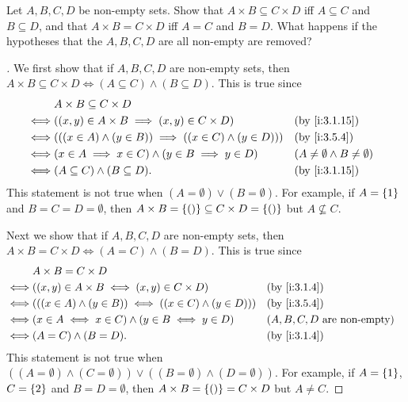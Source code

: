 \begin{ex}\label{i:ex:3.5.6}
  Let \(A, B, C, D\) be non-empty sets.
  Show that \(A \times B \subseteq C \times D\) iff \(A \subseteq C\) and \(B \subseteq D\), and that \(A \times B = C \times D\) iff \(A = C\) and \(B = D\).
  What happens if the hypotheses that the \(A, B, C, D\) are all non-empty are removed?
\end{ex}

\begin{proof}[]
  We first show that if \(A, B, C, D\) are non-empty sets, then \(A \times B \subseteq C \times D \iff (A \subseteq C) \land (B \subseteq D)\).
  This is true since
  \begin{align*}
         & A \times B \subseteq C \times D                                                                                      \\
    \iff & \pa{(x, y) \in A \times B \implies (x, y) \in C \times D}             &  & \by{i:3.1.15}                             \\
    \iff & \pa{((x \in A) \land (y \in B)) \implies ((x \in C) \land (y \in D))} &  & \by{i:3.5.4}                              \\
    \iff & \pa{x \in A \implies x \in C} \land \pa{y \in B \implies y \in D}     &  & (A \neq \emptyset \land B \neq \emptyset) \\
    \iff & (A \subseteq C) \land (B \subseteq D).                                &  & \by{i:3.1.15}
  \end{align*}
  This statement is not true when \((A = \emptyset) \lor (B = \emptyset)\).
  For example, if \(A = \left\lbrace1\right\rbrace\) and \(B = C = D = \emptyset\), then \(A \times B = \left\lbrace()\right\rbrace \subseteq C \times D = \left\lbrace()\right\rbrace\) but \(A \not \subseteq C\).

  Next we show that if \(A, B, C, D\) are non-empty sets, then \(A \times B = C \times D \iff (A = C) \land (B = D)\).
  This is true since
  \begin{align*}
         & A \times B = C \times D                                                                                      \\
    \iff & \pa{(x, y) \in A \times B \iff (x, y) \in C \times D}             &  & \by{i:3.1.4}                          \\
    \iff & \pa{((x \in A) \land (y \in B)) \iff ((x \in C) \land (y \in D))} &  & \by{i:3.5.4}                          \\
    \iff & (x \in A \iff x \in C) \land (y \in B \iff y \in D)               &  & \text{(\(A, B, C, D\) are non-empty)} \\
    \iff & (A = C) \land (B = D).                                            &  & \by{i:3.1.4}
  \end{align*}
  This statement is not true when \(((A = \emptyset) \land (C = \emptyset)) \lor ((B = \emptyset) \land (D = \emptyset))\).
  For example, if \(A = \left\lbrace1\right\rbrace\), \(C = \left\lbrace2\right\rbrace\) and \(B = D = \emptyset\), then \(A \times B = \left\lbrace()\right\rbrace = C \times D\) but \(A \neq C\).
\end{proof}

